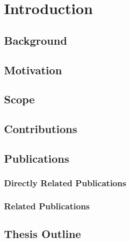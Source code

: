 \chapter{Introduction}
\label{Chapter1}

\lipsum[3-10]


\section{Background}
\label{Chapter1:Background}


\section{Motivation}
\label{Chapter1:Motivation}


\section{Scope}
\label{Chapter1:Scope}


\section{Contributions}
\label{Chapter1:Contributions}


\section{Publications}
\label{Chapter1:Publications}

\subsection{Directly Related Publications}

\subsection{Related Publications}


\section{Thesis Outline}
\label{Chapter1:ThesisOutline}




